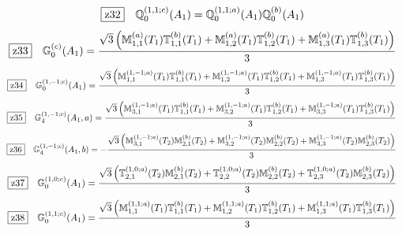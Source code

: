 \documentclass[fleqn,10pt,landscape]{jsarticle}
\begin{document}
\begin{dmath*}
\hspace*{3mm}\fbox{z32}\quad \mathbb{Q}_{0}^{(1,1;c)}(A_{1})=\mathbb{Q}_{0}^{(1,1;a)}(A_{1}) \mathbb{Q}_{0}^{(b)}(A_{1})
\end{dmath*}
\begin{dmath*}
\hspace*{3mm}\fbox{z33}\quad \mathbb{G}_{0}^{(c)}(A_{1})=\frac{\sqrt{3} \left(\mathbb{M}_{1,1}^{(a)}(T_{1}) \mathbb{T}_{1,1}^{(b)}(T_{1}) + \mathbb{M}_{1,2}^{(a)}(T_{1}) \mathbb{T}_{1,2}^{(b)}(T_{1}) + \mathbb{M}_{1,3}^{(a)}(T_{1}) \mathbb{T}_{1,3}^{(b)}(T_{1})\right)}{3}
\end{dmath*}
\begin{dmath*}
\hspace*{3mm}\fbox{z34}\quad \mathbb{G}_{0}^{(1,-1;c)}(A_{1})=\frac{\sqrt{3} \left(\mathbb{M}_{1,1}^{(1,-1;a)}(T_{1}) \mathbb{T}_{1,1}^{(b)}(T_{1}) + \mathbb{M}_{1,2}^{(1,-1;a)}(T_{1}) \mathbb{T}_{1,2}^{(b)}(T_{1}) + \mathbb{M}_{1,3}^{(1,-1;a)}(T_{1}) \mathbb{T}_{1,3}^{(b)}(T_{1})\right)}{3}
\end{dmath*}
\begin{dmath*}
\hspace*{3mm}\fbox{z35}\quad \mathbb{G}_{4}^{(1,-1;c)}(A_{1},a)=\frac{\sqrt{3} \left(\mathbb{M}_{3,1}^{(1,-1;a)}(T_{1}) \mathbb{T}_{1,1}^{(b)}(T_{1}) + \mathbb{M}_{3,2}^{(1,-1;a)}(T_{1}) \mathbb{T}_{1,2}^{(b)}(T_{1}) + \mathbb{M}_{3,3}^{(1,-1;a)}(T_{1}) \mathbb{T}_{1,3}^{(b)}(T_{1})\right)}{3}
\end{dmath*}
\begin{dmath*}
\hspace*{3mm}\fbox{z36}\quad \mathbb{G}_{4}^{(1,-1;c)}(A_{1},b)=- \frac{\sqrt{3} \left(\mathbb{M}_{3,1}^{(1,-1;a)}(T_{2}) \mathbb{M}_{2,1}^{(b)}(T_{2}) + \mathbb{M}_{3,2}^{(1,-1;a)}(T_{2}) \mathbb{M}_{2,2}^{(b)}(T_{2}) + \mathbb{M}_{3,3}^{(1,-1;a)}(T_{2}) \mathbb{M}_{2,3}^{(b)}(T_{2})\right)}{3}
\end{dmath*}
\begin{dmath*}
\hspace*{3mm}\fbox{z37}\quad \mathbb{G}_{0}^{(1,0;c)}(A_{1})=\frac{\sqrt{3} \left(\mathbb{T}_{2,1}^{(1,0;a)}(T_{2}) \mathbb{M}_{2,1}^{(b)}(T_{2}) + \mathbb{T}_{2,2}^{(1,0;a)}(T_{2}) \mathbb{M}_{2,2}^{(b)}(T_{2}) + \mathbb{T}_{2,3}^{(1,0;a)}(T_{2}) \mathbb{M}_{2,3}^{(b)}(T_{2})\right)}{3}
\end{dmath*}
\begin{dmath*}
\hspace*{3mm}\fbox{z38}\quad \mathbb{G}_{0}^{(1,1;c)}(A_{1})=\frac{\sqrt{3} \left(\mathbb{M}_{1,1}^{(1,1;a)}(T_{1}) \mathbb{T}_{1,1}^{(b)}(T_{1}) + \mathbb{M}_{1,2}^{(1,1;a)}(T_{1}) \mathbb{T}_{1,2}^{(b)}(T_{1}) + \mathbb{M}_{1,3}^{(1,1;a)}(T_{1}) \mathbb{T}_{1,3}^{(b)}(T_{1})\right)}{3}
\end{dmath*}
\end{document}
